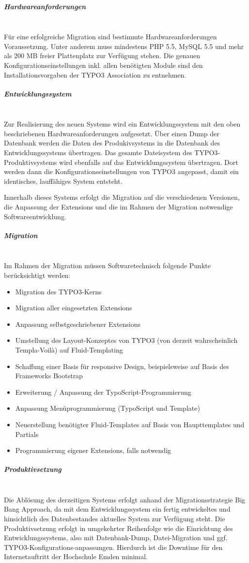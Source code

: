 \subparagraph{Hardwareanforderungen}\mbox{}\\
Für eine erfolgreiche Migration sind bestimmte Hardwareanforderungen Voraussetzung. Unter anderem muss mindestens PHP 5.5, MySQL 5.5 und mehr als 200 MB freier Plattenplatz zur Verfügung stehen. Die genauen Konfigurationseinstellungen inkl. allen benötigten Module sind den Installationsvorgaben der TYPO3 Association zu entnehmen.

\subparagraph{Entwicklungssystem}\mbox{}\\
Zur Realisierung des neuen Systems wird ein Entwicklungssystem mit den oben beschriebenen Hardwareanforderungen aufgesetzt. Über einen Dump der Datenbank werden die Daten des Produkivsystems in die Datenbank des Entwicklungssystems übertragen. Das gesamte Dateisystem des TYPO3-Produktivsystems wird ebenfalls auf das Entwicklungssystem übertragen. Dort werden dann die Konfigurationseinstellungen von TYPO3 angepasst, damit ein identisches, lauffähiges System entsteht.

Innerhalb dieses Systems erfolgt die Migration auf die verschiedenen Versionen, die Anpassung der Extensions und die im Rahmen der Migration notwendige Softwareentwicklung.

\subparagraph{Migration}\mbox{}\\
Im Rahmen der Migration müssen Softwaretechnisch folgende Punkte berücksichtigt werden:
\begin{itemize}
\item Migration des TYPO3-Kerns
\item Migration aller eingesetzten Extensions
\item Anpassung selbstgeschriebener Extensions
\item Umstellung des Layout-Konzeptes von TYPO3 (von derzeit wahrscheinlich Templa-Voilà) auf Fluid-Templating
\item Schaffung einer Basis für responsive Design, beispielsweise auf Basis des Frameworks Bootstrap
\item Erweiterung / Anpassung der TypoScript-Programmierung
\item Anpassung Menüprogrammierung (TypoScript und Template)
\item Neuerstellung benötigter Fluid-Templates auf Basis von Haupttemplates und Partials
\item Programmierung eigener Extensions, falls notwendig
\end{itemize}

\subparagraph{Produktivsetzung}\mbox{}\\
Die Ablösung des derzeitigen Systems erfolgt anhand der Migrationsstrategie Big Bang Approach, da mit dem Entwicklungssystem ein fertig entwickeltes und hinsichtlich des Datenbestandes aktuelles System zur Verfügung steht. Die Produktivsetzung erfolgt in umgekehrter Reihenfolge wie die Einrichtung des Entwicklungssystems, also mit Datenbank-Dump, Datei-Migration und ggf. TYPO3-Konfigurations-anpassungen. Hierdurch ist die Downtime für den Internetauftritt der Hochschule Emden minimal.

